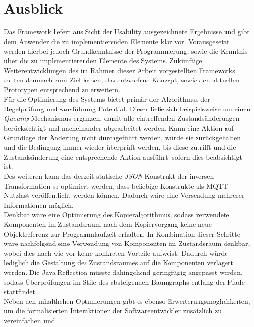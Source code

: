 \chapter{Ausblick}
\label{chap:ausblick}
    Das Framework liefert aus Sicht der Usability ausgezeichnete Ergebnisse und gibt dem Anwender die zu implementierenden Elemente klar vor. 
    Vorausgesetzt werden hierbei jedoch Grundkenntnisse der Programmierung, sowie die Kenntnis über die zu implementierenden Elemente des Systems. 
    Zukünftige Weiterentwicklungen des im Rahmen dieser Arbeit vorgestellten Frameworks sollten demnach zum Ziel haben, das entworfene Konzept, 
    sowie den aktuellen Prototypen entsprechend zu erweitern. 
    \\
    \linebreak
    Für die Optimierung des Systems bietet primär der Algorithmus der Regelprüfung und -ausführung Potential. Dieser ließe sich beispielsweise 
    um einen \textit{Queuing}-Mechanismus ergänzen, damit alle eintreffenden Zustandsänderungen berücksichtigt und nacheinander abgearbeitet werden. 
    Kann eine Aktion auf Grundlage der Änderung nicht durchgeführt werden, würde sie zurückgehalten und die Bedingung immer wieder überprüft 
    werden, bis diese zutrifft und die Zustandsänderung eine entsprechende Aktion ausführt, sofern dies beabsichtigt ist. 
    \\
    \linebreak
    Des weiteren kann das derzeit statische \textit{JSON}-Konstrukt der inversen Transformation so optimiert werden, dass beliebige Konstrukte 
    als \acs{MQTT}-Nutzlast veröffentlicht werden können. Dadurch wäre eine Versendung mehrerer Informationen möglich. 
    \\
    Denkbar wäre eine Optimierung des Kopieralgorithmus, sodass verwendete Komponenten im Zustandsraum nach dem Kopiervorgang keine neue 
    Objektreferenz zur Programmlaufzeit erhalten. In Kombination dieser Schritte wäre nachfolgend eine Verwendung von Komponenten im Zustandsraum denkbar, wobei 
    dies nach wie vor keine konkreten Vorteile aufweist. Dadurch würde lediglich die Gestaltung des Zustandsraumes auf die Komponenten verlagert werden. 
    Die Java Reflection müsste dahingehend geringfügig angepasst werden, sodass Überprüfungen im Stile des absteigenden Baumgraphs entlang der Pfade stattfindet.
    \\
    \linebreak
    Neben den inhaltlichen Optimierungen gibt es ebenso Erweiterungsmöglichkeiten, um die formalisierten Interaktionen der Softwareentwickler zusätzlich zu vereinfachen und 
